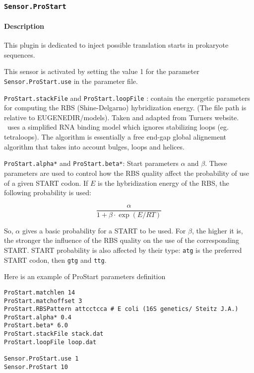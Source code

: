 
\subsubsection{\texttt{Sensor.ProStart}}
\label{prostart}
\paragraph{Description}

This plugin is dedicated to inject possible translation starts in prokaryote sequences.

This sensor is activated by setting the value 1 for the parameter \texttt{Sensor.ProStart.use} in the parameter file.

\texttt{ProStart.stackFile} and \texttt{ProStart.loopFile} : contain the energetic parameters for computing the RBS 
(Shine-Delgarno) hybridization energy. (The file path is relative to EUGENEDIR/models).
Taken and adapted from Turners website.
\EuGene\ uses a simplified RNA binding model which ignores stabilizing loops (eg. tetraloops). 
The algorithm is essentially a free end-gap global alignement algorithm that takes into account bulges, loops and helices.

\texttt{ProStart.alpha*} and \texttt{ProStart.beta*}: Start parameters $\alpha$ and $\beta$. 
These parameters are used to control how the RBS quality affect the probability of use of a given START codon. 
If $E$ is the hybridization energy of the RBS, the following probability is used:

\[\frac{\alpha}{1+\beta\cdot\exp(E/RT)}\]
  
So, $\alpha$ gives a basic probability for a START to be used. For $\beta$, the
higher it is, the stronger the influence of the RBS quality on the use of
the corresponding START.  START probability is also affected by their type: 
\texttt{atg} is the preferred START codon, then \texttt{gtg} and \texttt{ttg}.

Here is an example of ProStart parameters definition

\begin{Verbatim}[fontsize=\small]
ProStart.matchlen 14
ProStart.matchoffset 3
ProStart.RBSPattern attcctcca # E coli (16S genetics/ Steitz J.A.)
ProStart.alpha* 0.4
ProStart.beta* 6.0
ProStart.stackFile stack.dat
ProStart.loopFile loop.dat

Sensor.ProStart.use 1
Sensor.ProStart 10
\end{Verbatim}
                                                           
